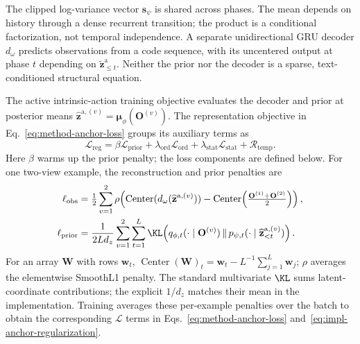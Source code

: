 The clipped log-variance vector $\mathbf s_\psi$ is shared across phases.
The mean depends on history through a dense recurrent transition; the product
is a conditional factorization, not temporal independence.
A separate unidirectional GRU decoder $d_\omega$ predicts observations from
a code sequence, with its uncentered output at phase $t$ depending on
$\widetilde{\mathbf z}^{\mathrm a}_{\leq t}$. Neither the prior nor the decoder is a sparse,
text-conditioned structural equation.

The active intrinsic-action training objective evaluates the decoder and
prior at posterior means $\widehat{\mathbf z}^{\mathrm a,(v)}=\boldsymbol\mu_\phi(\mathbf O^{(v)})$.
The representation objective in Eq.~\ref{eq:method-anchor-loss} groups
its auxiliary terms as
\begin{equation}
 \mathcal L_{\mathrm{reg}}
 =\beta\mathcal L_{\mathrm{prior}}
  +\lambda_{\mathrm{ord}}\mathcal L_{\mathrm{ord}}
  +\lambda_{\mathrm{stat}}\mathcal L_{\mathrm{stat}}
  +\mathcal R_{\mathrm{temp}}.
 \label{eq:impl-anchor-regularization}
\end{equation}
Here $\beta$ warms up the prior penalty; the loss components are defined below.
For one two-view example, the reconstruction and prior penalties are
\begin{equation}
 \begin{aligned}
  \ell_{\mathrm{obs}}
    &=\tfrac12\sum_{v=1}^{2}
       \rho\!\left(\operatorname{Center}(d_\omega(\widehat{\mathbf z}^{\mathrm a,(v)}))
          -\operatorname{Center}\!\left(\tfrac{\mathbf O^{(1)}+\mathbf O^{(2)}}2\right)\right),\\
  \ell_{\mathrm{prior}}
    &=\frac{1}{2Ld_z}\sum_{v=1}^{2}\sum_{t=1}^{L}
      \KL\!\left(q_{\phi,t}(\cdot\mid \mathbf O^{(v)})
        \,\|\,p_{\psi,t}(\cdot\mid\widehat{\mathbf z}^{\mathrm a,(v)}_{<t})\right).
 \end{aligned}
 \label{eq:impl-mean-prior-loss}
\end{equation}
For an array $\mathbf W$ with rows $\mathbf w_t$, $\operatorname{Center}(\mathbf W)_t=\mathbf w_t-L^{-1}\sum_{j=1}^L\mathbf w_j$;
$\rho$ averages the elementwise SmoothL1 penalty.
The standard multivariate $\KL$ sums latent-coordinate contributions;
the explicit $1/d_z$ matches their mean in the implementation.
Training averages these per-example penalties over the batch to obtain
the corresponding $\mathcal L$ terms in
Eqs.~\ref{eq:method-anchor-loss} and~\ref{eq:impl-anchor-regularization}.

